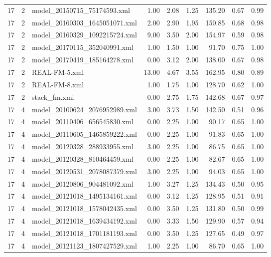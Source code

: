 \begin{table}[ht]
\begin{tabular}{rrlrrrrrr}
   17 &   2 & model\_20150715\_75174593.xml & 1.00 & 2.08 & 1.25 & 135.20 & 0.67 & 0.99 \\ 
   17 &   2 & model\_20160303\_1645051071.xml & 2.00 & 2.90 & 1.95 & 150.85 & 0.68 & 0.98 \\ 
   17 &   2 & model\_20160329\_1092215724.xml & 9.00 & 3.50 & 2.00 & 154.97 & 0.59 & 0.98 \\ 
   17 &   2 & model\_20170115\_352040991.xml & 1.00 & 1.50 & 1.00 & 91.70 & 0.75 & 1.00 \\ 
   17 &   2 & model\_20170419\_185164278.xml & 0.00 & 3.12 & 2.00 & 138.00 & 0.67 & 0.98 \\ 
   17 &   2 & REAL-FM-5.xml & 13.00 & 4.67 & 3.55 & 162.95 & 0.80 & 0.89 \\ 
   17 &   2 & REAL-FM-8.xml & 1.00 & 1.75 & 1.00 & 128.70 & 0.62 & 1.00 \\ 
   17 &   2 & stack\_fm.xml & 0.00 & 2.75 & 1.75 & 142.68 & 0.67 & 0.97 \\ 
   17 &   4 & model\_20100624\_2076952989.xml & 3.00 & 3.73 & 1.50 & 142.50 & 0.51 & 0.96 \\ 
   17 &   4 & model\_20110406\_656545830.xml & 0.00 & 2.25 & 1.00 & 90.17 & 0.65 & 1.00 \\ 
   17 &   4 & model\_20110605\_1465859222.xml & 0.00 & 2.25 & 1.00 & 91.83 & 0.65 & 1.00 \\ 
   17 &   4 & model\_20120328\_288933955.xml & 3.00 & 2.25 & 1.00 & 86.75 & 0.65 & 1.00 \\ 
   17 &   4 & model\_20120328\_810464459.xml & 0.00 & 2.25 & 1.00 & 82.67 & 0.65 & 1.00 \\ 
   17 &   4 & model\_20120531\_2078087379.xml & 3.00 & 2.25 & 1.00 & 94.03 & 0.65 & 1.00 \\ 
   17 &   4 & model\_20120806\_904481092.xml & 1.00 & 3.27 & 1.25 & 134.43 & 0.50 & 0.95 \\ 
   17 &   4 & model\_20121018\_1495134161.xml & 0.00 & 3.12 & 1.25 & 128.95 & 0.51 & 0.91 \\ 
   17 &   4 & model\_20121018\_1578042435.xml & 0.00 & 3.50 & 1.25 & 131.80 & 0.50 & 0.99 \\ 
   17 &   4 & model\_20121018\_1639434192.xml & 0.00 & 3.33 & 1.50 & 129.90 & 0.57 & 0.94 \\ 
   17 &   4 & model\_20121018\_1701181193.xml & 0.00 & 3.50 & 1.25 & 127.65 & 0.49 & 0.97 \\ 
   17 &   4 & model\_20121123\_1807427529.xml & 1.00 & 2.25 & 1.00 & 86.70 & 0.65 & 1.00 \\ 

\end{tabular}
\end{table}
